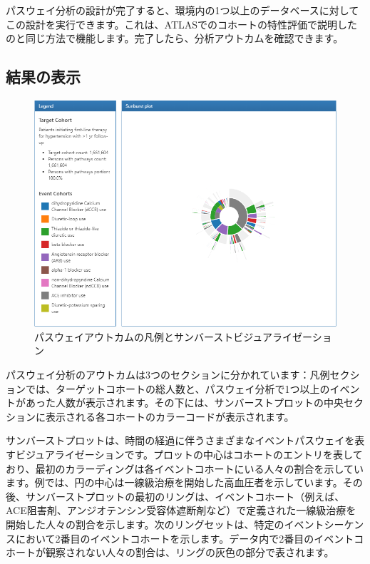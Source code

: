 \documentclass[
  11pt]{book}
\theoremstyle{definition}
\theoremstyle{definition}
\theoremstyle{definition}
\theoremstyle{definition}
\theoremstyle{remark}
\begin{document}
パスウェイ分析の設計が完了すると、環境内の1つ以上のデータベースに対してこの設計を実行できます。これは、ATLASでのコホートの特性評価で説明したのと同じ方法で機能します。完了したら、分析アウトカムを確認できます。

\subsection{結果の表示}\label{ux7d50ux679cux306eux8868ux793a}

\begin{figure}

{\centering \includegraphics[width=1\linewidth]{images/Characterization/atlasPathwaysResults} 

}

\caption{パスウェイアウトカムの凡例とサンバーストビジュアライゼーション}\label{fig:atlasPathwaysResults}
\end{figure}

パスウェイ分析のアウトカムは3つのセクションに分かれています：凡例セクションでは、ターゲットコホートの総人数と、パスウェイ分析で1つ以上のイベントがあった人数が表示されます。その下には、サンバーストプロットの中央セクションに表示される各コホートのカラーコードが表示されます。

サンバーストプロットは、時間の経過に伴うさまざまなイベントパスウェイを表すビジュアライゼーションです。プロットの中心はコホートのエントリを表しており、最初のカラーディングは各イベントコホートにいる人々の割合を示しています。例では、円の中心は一線級治療を開始した高血圧者を示しています。その後、サンバーストプロットの最初のリングは、イベントコホート（例えば、ACE阻害剤、アンジオテンシン受容体遮断剤など）で定義された一線級治療を開始した人々の割合を示します。次のリングセットは、特定のイベントシーケンスにおいて2番目のイベントコホートを示します。データ内で2番目のイベントコホートが観察されない人々の割合は、リングの灰色の部分で表されます。
\end{document}

